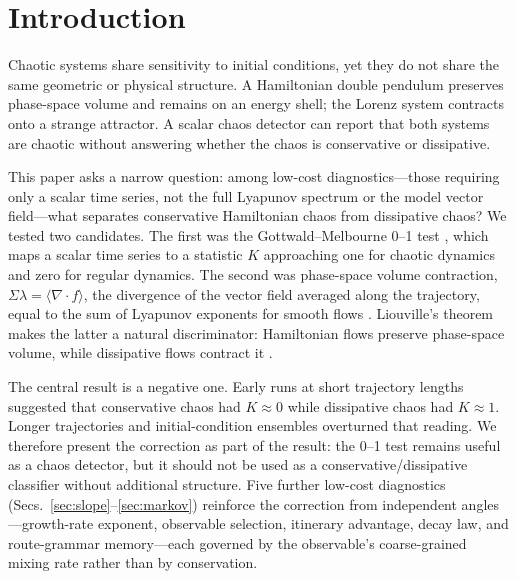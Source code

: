 \documentclass[aip,cha,preprint,amsmath,amssymb,floatfix]{revtex4-2}
\begin{document}
\maketitle

\section{Introduction}

Chaotic systems share sensitivity to initial conditions, yet they do not share the
same geometric or physical structure. A Hamiltonian double pendulum preserves
phase-space volume and remains on an energy shell; the Lorenz system
\cite{lorenz1963} contracts onto a strange attractor. A scalar chaos detector can report that both systems are
chaotic without answering whether the chaos is conservative or dissipative.

This paper asks a narrow question: among low-cost diagnostics---those requiring only
a scalar time series, not the full Lyapunov spectrum or the model vector
field---what separates conservative Hamiltonian chaos from dissipative chaos? We
tested two candidates. The first was the Gottwald--Melbourne 0--1 test
\cite{gottwald2004,gottwald2009,falconer2007}, which maps a scalar time series to a
statistic $K$ approaching one for chaotic dynamics and zero for regular dynamics.
The second was phase-space volume contraction,
$\Sigma\lambda=\langle\nabla\!\cdot f\rangle$, the divergence of the vector field
averaged along the trajectory, equal to the sum of Lyapunov exponents for smooth
flows \cite{benettin1980,kantz2004}. Liouville's theorem makes the latter a
natural discriminator: Hamiltonian flows preserve phase-space volume, while
dissipative flows contract it \cite{strogatz1994}.

The central result is a negative one. Early runs at short trajectory lengths
suggested that conservative chaos had $K\approx0$ while dissipative chaos had
$K\approx1$. Longer trajectories and initial-condition ensembles overturned that
reading. We therefore present the correction as part of the result: the 0--1 test
remains useful as a chaos detector, but it should not be used as a
conservative/dissipative classifier without additional structure. Five further
low-cost diagnostics (Secs.~\ref{sec:slope}--\ref{sec:markov}) reinforce the
correction from independent angles---growth-rate exponent, observable selection,
itinerary advantage, decay law, and route-grammar memory---each governed by the
observable's coarse-grained mixing rate rather than by conservation.
\end{document}
